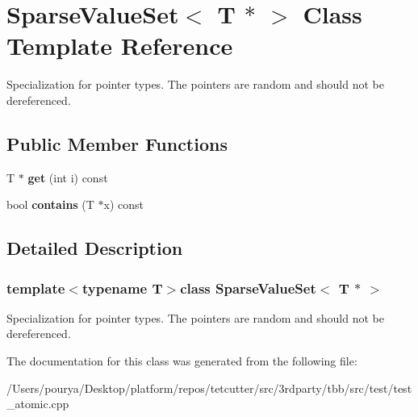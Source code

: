 \hypertarget{classSparseValueSet_3_01T_01_5_01_4}{}\section{Sparse\+Value\+Set$<$ T $\ast$ $>$ Class Template Reference}
\label{classSparseValueSet_3_01T_01_5_01_4}


Specialization for pointer types. The pointers are random and should not be dereferenced.  


\subsection*{Public Member Functions}
\begin{DoxyCompactItemize}
\item 
\hypertarget{classSparseValueSet_3_01T_01_5_01_4_ac1b888f91d8c546992073db4208f84e2}{}T $\ast$ {\bfseries get} (int i) const \label{classSparseValueSet_3_01T_01_5_01_4_ac1b888f91d8c546992073db4208f84e2}

\item 
\hypertarget{classSparseValueSet_3_01T_01_5_01_4_a56565229d655d93a3acae74bb921d8d4}{}bool {\bfseries contains} (T $\ast$x) const \label{classSparseValueSet_3_01T_01_5_01_4_a56565229d655d93a3acae74bb921d8d4}

\end{DoxyCompactItemize}


\subsection{Detailed Description}
\subsubsection*{template$<$typename T$>$class Sparse\+Value\+Set$<$ T $\ast$ $>$}

Specialization for pointer types. The pointers are random and should not be dereferenced. 

The documentation for this class was generated from the following file\+:\begin{DoxyCompactItemize}
\item 
/\+Users/pourya/\+Desktop/platform/repos/tetcutter/src/3rdparty/tbb/src/test/test\+\_\+atomic.\+cpp\end{DoxyCompactItemize}
